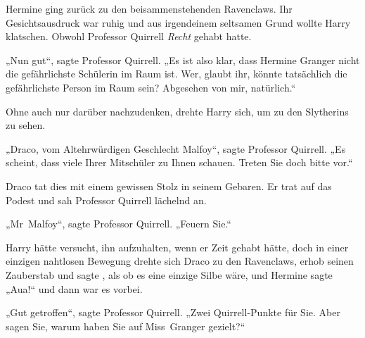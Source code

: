 Hermine ging zurück zu den beisammenstehenden Ravenclaws. Ihr Gesichtsausdruck war ruhig und aus irgendeinem seltsamen Grund wollte Harry klatschen. Obwohl Professor Quirrell \emph{Recht} gehabt hatte.

„Nun gut“, sagte Professor Quirrell.
„Es ist also klar, dass Hermine Granger nicht die gefährlichste Schülerin im Raum ist. Wer, glaubt ihr, könnte tatsächlich die gefährlichste Person im Raum sein? Abgesehen von mir, natürlich.“

Ohne auch nur darüber nachzudenken, drehte Harry sich, um zu den Slytherins zu sehen.

„Draco, vom Altehrwürdigen Geschlecht Malfoy“, sagte Professor Quirrell.
„Es scheint, dass viele Ihrer Mitschüler zu Ihnen schauen. Treten Sie doch bitte vor.“

Draco tat dies mit einem gewissen Stolz in seinem Gebaren. Er trat auf das Podest und sah Professor Quirrell lächelnd an.

„Mr~Malfoy“, sagte Professor Quirrell.
„Feuern Sie.“

Harry hätte versucht, ihn aufzuhalten, wenn er Zeit gehabt hätte, doch in einer einzigen nahtlosen Bewegung drehte sich Draco zu den Ravenclaws, erhob seinen Zauberstab und sagte , als ob es eine einzige Silbe wäre, und Hermine sagte
„Aua!“ und dann war es vorbei.

„Gut getroffen“, sagte Professor Quirrell.
„Zwei Quirrell-Punkte für Sie. Aber sagen Sie, warum haben Sie auf Miss~Granger gezielt?“

